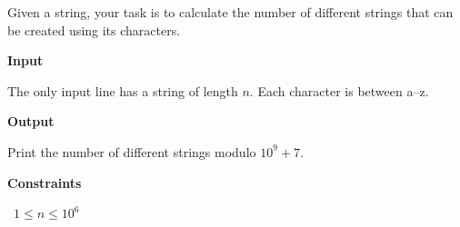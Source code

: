 Given a string, your task is to calculate the number of different strings that can be created using its characters.

\vspace{0.3cm}\noindent\textbf{Input}

The only input line has a string of length $n$. Each character is between a–z.

\vspace{0.3cm}\noindent\textbf{Output}

Print the number of different strings modulo $10^9+7$.

\vspace{0.3cm}\noindent\textbf{Constraints}

\textbullet\ $1 \le n \le 10^6$